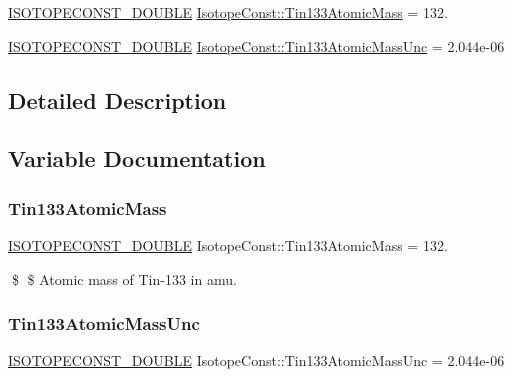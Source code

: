 \begin{DoxyCompactItemize}
\item 
\mbox{\hyperlink{group___isotope_const-_macros_ga8f45a7272ce02c0b4c65c44636ed719a}{I\+S\+O\+T\+O\+P\+E\+C\+O\+N\+S\+T\+\_\+\+D\+O\+U\+B\+LE}} \mbox{\hyperlink{group___isotope_const-_tin-_sn133_ga9fe5aa1a03807e99eb1f8344f793cdec}{Isotope\+Const\+::\+Tin133\+Atomic\+Mass}} = 132.
\item 
\mbox{\hyperlink{group___isotope_const-_macros_ga8f45a7272ce02c0b4c65c44636ed719a}{I\+S\+O\+T\+O\+P\+E\+C\+O\+N\+S\+T\+\_\+\+D\+O\+U\+B\+LE}} \mbox{\hyperlink{group___isotope_const-_tin-_sn133_gad34d601a26e229e6398ab335fa846fe8}{Isotope\+Const\+::\+Tin133\+Atomic\+Mass\+Unc}} = 2.\+044e-\/06
\end{DoxyCompactItemize}


\subsection{Detailed Description}


\subsection{Variable Documentation}
\mbox{\label{group___isotope_const-_tin-_sn133_ga9fe5aa1a03807e99eb1f8344f793cdec}} 
\subsubsection{\texorpdfstring{Tin133\+Atomic\+Mass}{Tin133AtomicMass}}
{\footnotesize\ttfamily \mbox{\hyperlink{group___isotope_const-_macros_ga8f45a7272ce02c0b4c65c44636ed719a}{I\+S\+O\+T\+O\+P\+E\+C\+O\+N\+S\+T\+\_\+\+D\+O\+U\+B\+LE}} Isotope\+Const\+::\+Tin133\+Atomic\+Mass = 132.}

\$ \$ Atomic mass of Tin-\/133 in amu. \mbox{\label{group___isotope_const-_tin-_sn133_gad34d601a26e229e6398ab335fa846fe8}} 
\subsubsection{\texorpdfstring{Tin133\+Atomic\+Mass\+Unc}{Tin133AtomicMassUnc}}
{\footnotesize\ttfamily \mbox{\hyperlink{group___isotope_const-_macros_ga8f45a7272ce02c0b4c65c44636ed719a}{I\+S\+O\+T\+O\+P\+E\+C\+O\+N\+S\+T\+\_\+\+D\+O\+U\+B\+LE}} Isotope\+Const\+::\+Tin133\+Atomic\+Mass\+Unc = 2.\+044e-\/06}

